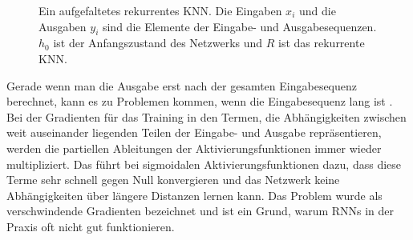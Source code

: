 \begin{figure}
\label{fig:rnn}
\centering
\caption{Ein \glqq aufgefaltetes\grqq{} rekurrentes KNN. Die Eingaben $x_i$ und die Ausgaben $y_i$ sind die Elemente der Eingabe- und Ausgabesequenzen. $h_0$ ist der Anfangszustand des Netzwerks und $R$ ist das rekurrente KNN.}
\end{figure}

Gerade wenn man die Ausgabe erst nach der gesamten Eingabesequenz berechnet, kann es zu Problemen kommen, wenn die Eingabesequenz lang ist \cite{vanishing_gradients}.
Bei der Gradienten für das Training in den Termen, die Abhängigkeiten zwischen weit auseinander liegenden Teilen der Eingabe- und Ausgabe repräsentieren, werden die partiellen Ableitungen der Aktivierungsfunktionen immer wieder multipliziert.
Das führt bei sigmoidalen Aktivierungsfunktionen dazu, dass diese Terme sehr schnell gegen Null konvergieren und das Netzwerk keine Abhängigkeiten über längere Distanzen lernen kann.
Das Problem wurde als \glqq verschwindende Gradienten\grqq{} bezeichnet und ist ein Grund, warum RNNs in der Praxis oft nicht gut funktionieren.

